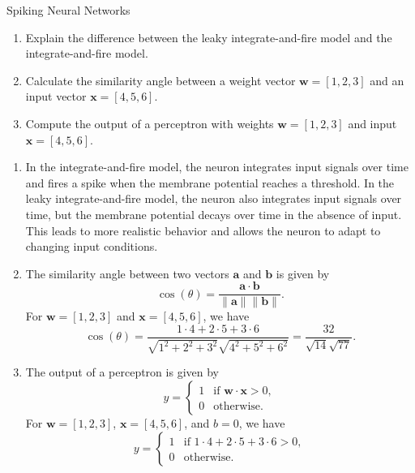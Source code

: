 \documentclass{article}
\begin{document}
\begin{exercise}{Spiking Neural Networks}
  \begin{enumerate}
    \item Explain the difference between the leaky integrate-and-fire model and the integrate-and-fire model.
    \item Calculate the similarity angle between a weight vector $\mathbf{w} = [1, 2, 3]$ and an input vector $\mathbf{x} = [4, 5, 6]$.
    \item Compute the output of a perceptron with weights $\mathbf{w} = [1, 2, 3]$ and input $\mathbf{x} = [4, 5, 6]$.
  \end{enumerate}

  \begin{solution}
    \begin{enumerate}
      \item In the integrate-and-fire model, the neuron integrates input signals over time and fires a spike when the membrane potential reaches a threshold. In the leaky integrate-and-fire model, the neuron also integrates input signals over time, but the membrane potential decays over time in the absence of input. This leads to more realistic behavior and allows the neuron to adapt to changing input conditions.
      \item The similarity angle between two vectors $\mathbf{a}$ and $\mathbf{b}$ is given by
        \[ \cos(\theta) = \frac{\mathbf{a} \cdot \mathbf{b}}{\|\mathbf{a}\| \|\mathbf{b}\|}. \]
        For $\mathbf{w} = [1, 2, 3]$ and $\mathbf{x} = [4, 5, 6]$, we have
        \[ \cos(\theta) = \frac{1 \cdot 4 + 2 \cdot 5 + 3 \cdot 6}{\sqrt{1^2 + 2^2 + 3^2} \sqrt{4^2 + 5^2 + 6^2}} = \frac{32}{\sqrt{14} \sqrt{77}}. \]
      \item The output of a perceptron is given by
        \[
          y = \begin{cases}
            1 & \text{if } \mathbf{w} \cdot \mathbf{x} > 0, \\
            0 & \text{otherwise}.
          \end{cases}
        \]
        For $\mathbf{w} = [1, 2, 3]$, $\mathbf{x} = [4, 5, 6]$, and $b = 0$, we have
        \[
          y = \begin{cases}
            1 & \text{if } 1 \cdot 4 + 2 \cdot 5 + 3 \cdot 6 > 0, \\
            0 & \text{otherwise}.
          \end{cases}
        \]
    \end{enumerate}
  \end{solution}
\end{exercise}
\end{document}
